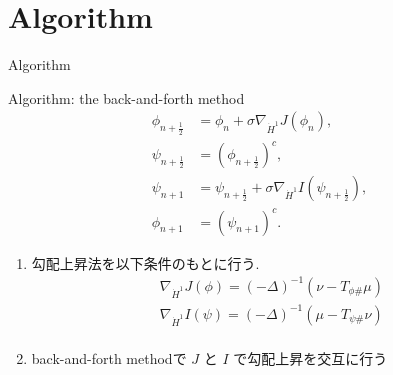 \documentclass[aspectratio=169, dvipdfmx, 12pt]{beamer}
\begin{document}




\section{Algorithm}
\begin{frame}{Algorithm}
    \begin{block}{Algorithm: the back-and-forth method}
        \begin{align*}
            \phi_{n + \frac{1}{2}} &= \phi_{n} + \sigma \nabla_{\dot{H}^1} J(\phi_{n}),\\
            \psi_{n + \frac{1}{2}} &= (\phi_{n + \frac{1}{2}})^c,\\
            \psi_{n + 1} &= \psi_{n + \frac{1}{2}} + \sigma \nabla_{\dot{H}^1} I(\psi_{n + \frac{1}{2}}),\\
            \phi_{n + 1} &= (\psi_{n + 1})^c.
        \end{align*}
    \end{block}

    \begin{enumerate}
        \item 勾配上昇法を以下条件のもとに行う.
        \begin{align*}
            \nabla_{\dot{H}^1} J(\phi) = (- \Delta)^{-1} (\nu - T_{\phi \#} \mu)\\
            \nabla_{\dot{H}^1} I(\psi) = (- \Delta)^{-1} (\mu - T_{\psi \#} \nu)\\
        \end{align*}
        \item back-and-forth methodで $J$ と $I$ で勾配上昇を交互に行う
    \end{enumerate}

\end{frame}

\end{document}
